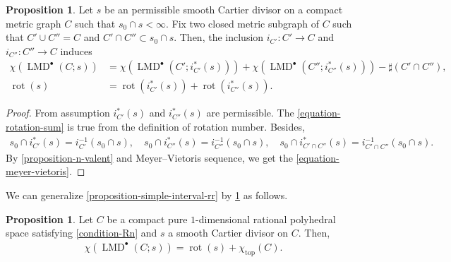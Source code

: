 \documentclass[a4paper,dvipdfmx,reqno,12pt]{amsart}
\theoremstyle{definition}
\newtheorem{proposition}[theorem]{Proposition}
\newcommand{\opn}[1]{\operatorname{#1}}
\numberwithin{equation}{section}
\begin{document}
\begin{proposition}
\label{proposition-gluing-formula}
Let $s$ be an permissible smooth Cartier divisor on a
compact metric graph $C$ such that $s_0\cap s<\infty$.
Fix two closed metric subgraph of $C$ such that
$C' \cup C''=C$ and $C'\cap C''\subset s_0 \cap s$.
Then, 
the inclusion $i_{C'}\colon C'\to C$ 
and $i_{C''}\colon C''\to C$ induces
\begin{align}
\label{equation-meyer-vietoris}
\chi(\opn{LMD}^{\bullet}(C;s))
&=\chi(\opn{LMD}^{\bullet}(C';i_{C'}^{*}(s)))
+\chi(\opn{LMD}^{\bullet}(C'';i_{C''}^{*}(s)))
-\sharp(C'\cap C''), \\
\label{equation-rotation-sum}
\opn{rot}(s)&=\opn{rot}(i_{C'}^{*}(s))
+\opn{rot}(i_{C''}^{*}(s)).
\end{align}
\end{proposition}
\begin{proof}
From assumption $i^{*}_{C'}(s)$ and 
$i^{*}_{C''}(s)$ are permissible.
The \cref{equation-rotation-sum} is true from
the definition of rotation number. 
 Besides,
\begin{align}
s_0\cap i^{*}_{C'}(s)=i^{-1}_{C'}(s_0\cap s), \quad 
s_0\cap i^{*}_{C''}(s)=i^{-1}_{C''}(s_0\cap s), \quad
s_0\cap i^{*}_{C'\cap C''}(s)=
i^{-1}_{C'\cap C''}(s_0\cap s).
\end{align}
By \cref{proposition-n-valent} 
and Meyer--Vietoris sequence, we get 
the \cref{equation-meyer-vietoris}.
\end{proof}

We can generalize
\cref{proposition-simple-interval-rr} by
\cref{proposition-gluing-formula} as follows.

\begin{proposition}
\label{proposition-MRR-1-dim-poly-space}
Let $C$ be a compact pure $1$-dimensional rational 
polyhedral space satisfying \cref{condition-Rn} 
and $s$ a smooth Cartier divisor on $C$. Then,
\begin{align}
\chi(\opn{LMD}^{\bullet}(C;s))=\opn{rot}(s)+
\chi_{\opn{top}}(C).
\end{align}
\end{proposition}
\end{document}
